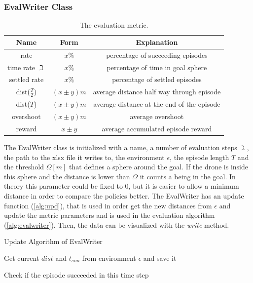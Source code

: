 \subsubsection{EvalWriter Class} \label{sec:evalw}
\begin{table}
	\centering
	\caption{The evaluation metric.}\label{tab:evalmetric}
	\begin{tabular}{c|c|c}
		Name & Form & Explanation\\
		\hline
		rate & $x \%$ & percentage of succeeding episodes\\
		time rate $\beth$ & $x\%$ & percentage of time in goal sphere\\
		settled rate & $x\%$ & percentage of settled episodes\\
		dist($\frac{T}{2}$) & $(x \pm y) m $& average distance half way through episode\\
		dist($T$) &  $(x \pm y) m $ & average distance at the end of the episode\\
		overshoot & $(x \pm y) m $ & average overshoot\\
		reward & $x \pm y $ & average accumulated episode reward
	\end{tabular}
\end{table}

The EvalWriter class is initialized with a name, a number of evaluation steps $\gimel$, the path to the xlsx file it writes to, 
the environment $\epsilon$, the episode length  $T$ and the threshold $\Omega[m]$ that defines a sphere around the goal. 
If the drone is inside this sphere and the distance is lower than $\Omega$ it counts a being in the goal. 
In theory this parameter could be fixed to 0, but it is easier to allow a minimum distance in order to compare the policies better.
The EvalWriter has  an update function (\cref{alg:upd}), that is used in order get the new distances from $\epsilon$ 
and update the metric parameters and is used in the evaluation algorithm (\cref{alg:evalwriter}). Then, the data can be visualized with the \emph{write} method.

\begin{algorithm}
	\caption{Update Algorithm of EvalWriter}
	\label{alg:upd}
	Get current $dist$ and $t_{sim}$ from environment $\epsilon$ and save it
	
		
		
	
	
	Check if the episode succeeded in this time step
\end{algorithm}

